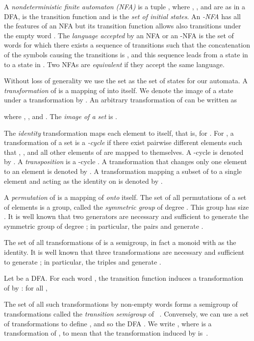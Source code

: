 \documentclass[final]{dmtcs-episciences}
\theoremstyle{definition}
\theoremstyle{remark}
\begin{document}
A \emph{nondeterministic finite automaton (NFA)} is a tuple , where 
, , and  are as in a DFA,  is the transition function 
and  is the \emph{set of initial states}.
An \emph{-NFA} has all the features of an NFA but its transition function 
 allows also transitions under the empty word . 
The \emph{language accepted} by an NFA or an -NFA is the set of words  for which there exists a sequence of transitions such that the concatenation of the symbols causing the transitions is ,
and this sequence leads from a state in  to a state in .
Two NFAs are \emph{equivalent} if they accept the same language.

Without loss of generality we use the set  as the set of states for our automata.
A \emph{transformation} of  is a mapping of  into itself.
We denote the image of a state  under a transformation  by .
An arbitrary transformation of  can be written as
\goodbreak


where ,  , and .
The \emph{image of a set}  
is .


The \emph{identity} transformation  maps  each element to itself, that is,  for .
For ,  a
transformation  of a set  is a \emph{-cycle} if there exist pairwise different elements  such that
,  , and all other elements of  are mapped to themselves.
A -cycle is denoted by .
A \emph{transposition} is a -cycle .
A transformation that changes only one element  to an element  is denoted by .
A transformation mapping a subset  of  to a single element  and acting as the identity on  is denoted by .

A \emph{permutation} of  is a mapping of  \emph{onto} itself. 
The set of all permutations of a set  of  elements is a group, 
called the \emph{symmetric group} of degree . 
This group has size .
It is well known that  two generators are necessary and sufficient to generate the symmetric group of degree ;
 in particular, the pairs  and  generate .


The set  of all transformations of  
is a semigroup, in fact a monoid with  as the identity. 
It is well known that three transformations are necessary and sufficient to generate  ;
in particular,  the triples
  and  generate .

Let  be a DFA. For each word , the transition function induces a transformation  of  by  : for all , 
 
The set  of all such transformations by non-empty words forms a semigroup of transformations called the \emph{transition semigroup} of ~\cite{Pin97}. 
Conversely, we can use a set   of transformations to define , and so the DFA . We write , where  is a transformation of , to mean that the transformation  induced by  is~. 
\end{document}
